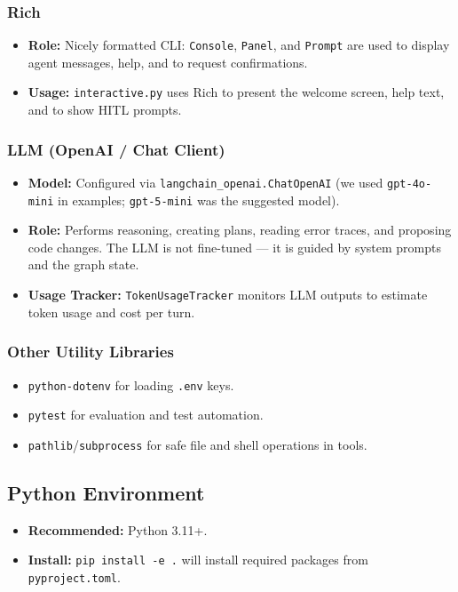 \documentclass[12pt, a4paper]{article}
\begin{document}
\subsubsection{Rich}
\begin{itemize}
  \item \textbf{Role:} Nicely formatted CLI: \texttt{Console}, \texttt{Panel}, and \texttt{Prompt} are used to display agent messages, help, and to request confirmations.
  \item \textbf{Usage:} \texttt{interactive.py} uses Rich to present the welcome screen, help text, and to show HITL prompts.
\end{itemize}

\subsubsection{LLM (OpenAI / Chat Client)}
\begin{itemize}
  \item \textbf{Model:} Configured via \texttt{langchain\_openai.ChatOpenAI} (we used \texttt{gpt-4o-mini} in examples; \texttt{gpt-5-mini} was the suggested model).
  \item \textbf{Role:} Performs reasoning, creating plans, reading error traces, and proposing code changes. The LLM is not fine-tuned — it is guided by system prompts and the graph state.
  \item \textbf{Usage Tracker:} \texttt{TokenUsageTracker} monitors LLM outputs to estimate token usage and cost per turn.
\end{itemize}

\subsubsection{Other Utility Libraries}
\begin{itemize}
  \item \texttt{python-dotenv} for loading \texttt{.env} keys.
  \item \texttt{pytest} for evaluation and test automation.
  \item \texttt{pathlib}/\texttt{subprocess} for safe file and shell operations in tools.
\end{itemize}

\subsection{Python Environment}
\begin{itemize}
  \item \textbf{Recommended:} Python 3.11+.
  \item \textbf{Install:} \texttt{pip install -e .} will install required packages from \texttt{pyproject.toml}.
\end{itemize}
\end{document}
